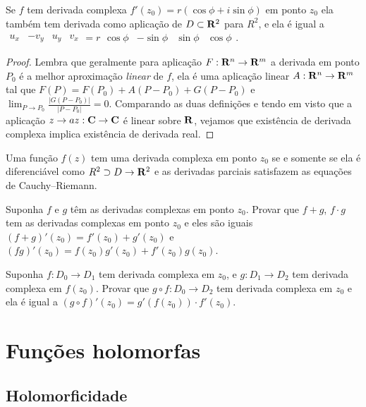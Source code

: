 \begin{lema}
Se $f$ tem derivada complexa $f'(z_0) = r (\cos\phi + i \sin \phi)$ em ponto $z_0$
ela também tem derivada como aplicação
de $D \subset \mathbf{R}^2$ para $R^2$, e ela é igual a
$\begin{smallmatrix} u_x & -v_y & u_y & v_x \end{smallmatrix}
= r \begin{smallmatrix} \cos\phi & -\sin\phi & \sin\phi & \cos\phi \end{smallmatrix} $.
\end{lema}
\begin{proof}
Lembra que geralmente para aplicação $F: \mathbf{R}^n \to \mathbf{R}^m$ a derivada em ponto $P_0$
é a melhor aproximação \emph{linear} de $f$, ela é uma aplicação linear $A: \mathbf{R}^n \to \mathbf{R}^m$
tal que $F(P) = F(P_0) + A (P-P_0) + G(P-P_0)$ e $\lim_{P\to P_0} \frac{|G(P-P_0)|}{|P-P_0|} = 0$.
Comparando as duas definições e tendo em visto que a aplicação $z \to az : \mathbf{C} \to \mathbf{C}$
é linear sobre $\mathbf{R}$, vejamos que existência de derivada complexa implica existência de derivada real.
\end{proof}

\begin{teorema}
Uma função $f(z)$ tem uma derivada complexa em ponto $z_0$ se e somente se
ela é diferenciável como $R^2\supset D \to \mathbf{R}^2$ e as derivadas parciais
satisfazem as equações de Cauchy--Riemann.
\end{teorema}

\begin{problema}
Suponha $f$ e $g$ têm as derivadas complexas em ponto $z_0$.
Provar que $f+g$, $f\cdot g$ tem as derivadas complexas em ponto $z_0$
e eles são iguais $(f+g)'(z_0) = f'(z_0)+g'(z_0)$ e $(fg)'(z_0) = f(z_0) g'(z_0) + f'(z_0) g(z_0)$.
\end{problema}

\begin{problema}
Suponha $f: D_0 \to D_1$ tem derivada complexa em $z_0$,
e $g : D_1 \to D_2$ tem derivada complexa em $f(z_0)$.
Provar que $g\circ f: D_0 \to D_2$ tem derivada complexa em $z_0$
e ela é igual a $(g\circ f)'(z_0) = g'(f(z_0)) \cdot f'(z_0)$. 
\end{problema}

\section{Funções holomorfas}

\subsection{Holomorficidade}

